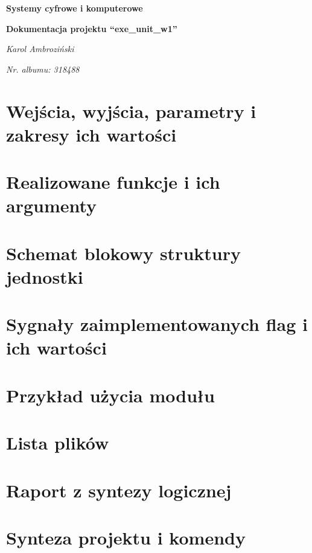 \documentclass[12pt]{article}
\title{}
\author{}
\date{}
\begin{document}
	\begin{titlepage}
		\centering
		\vspace{1cm}
		{\huge\bfseries Systemy cyfrowe i komputerowe\par}
		\vspace{0.5cm}
		{\huge\bfseries Dokumentacja projektu ``exe\_unit\_w1''\par}
		\vspace{2cm}
		{\Large\itshape Karol Ambroziński\par}
		\vspace{0cm}
		{\Large\itshape Nr. albumu: 318488\par}
		\vfill
	\end{titlepage}

	\tableofcontents
	
	\newpage
	
	\section{Wejścia, wyjścia, parametry i zakresy ich wartości}
	
	
	
	\section{Realizowane funkcje i ich argumenty}

	
	
	\section{Schemat blokowy struktury jednostki}
	
	
	
	\section{Sygnały zaimplementowanych flag i ich wartości}
	
	

	\newpage

	\section{Przykład użycia modułu}
	
	\section{Lista plików}
	
	\newpage
	\section{Raport z syntezy logicznej}
	
	\section{Synteza projektu i komendy}
	
\end{document}
